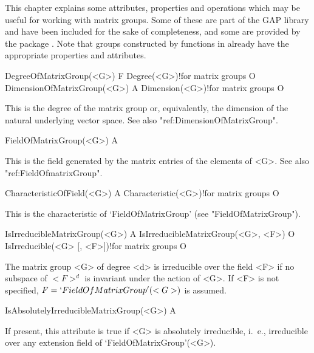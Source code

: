 
This chapter explains some attributes, properties and operations which may
be useful for working with matrix groups. Some of these are part of the 
GAP library and have been included for the sake of completeness, and some
are provided by the package {\IRREDSOL}. Note that groups constructed
by functions in {\IRREDSOL} already have the appropriate properties and
attributes. 



\>DegreeOfMatrixGroup(<G>) F
\>Degree(<G>)!{for matrix groups} O
\>DimensionOfMatrixGroup(<G>) A
\>Dimension(<G>)!{for matrix groups} O

This is the degree of the matrix group or, equivalently, the dimension of the
natural underlying vector space. See also "ref:DimensionOfMatrixGroup".

\>FieldOfMatrixGroup(<G>) A

This is the field generated by the matrix entries of the elements of <G>. See also 
"ref:FieldOfmatrixGroup".


\>CharacteristicOfField(<G>) A
\>Characteristic(<G>)!{for matrix groups} O

This is the characteristic of `FieldOfMatrixGroup' (see "FieldOfMatrixGroup").


\>IsIrreducibleMatrixGroup(<G>) A
\>IsIrreducibleMatrixGroup(<G>, <F>) O
\>IsIrreducible(<G> [, <F>])!{for matrix groups} O

The matrix group <G> of degree <d> is irreducible over the field <F> if no subspace of $<F>^d$ is
invariant under the action of <G>. If <F> is not
specified, $F = `FieldOfMatrixGroup'(<G>)$ is assumed.

\>IsAbsolutelyIrreducibleMatrixGroup(<G>) A

If present, this attribute is true if <G> is absolutely irreducible, i.~e., irreducible over any
extension field of `FieldOfMatrixGroup'(<G>).

